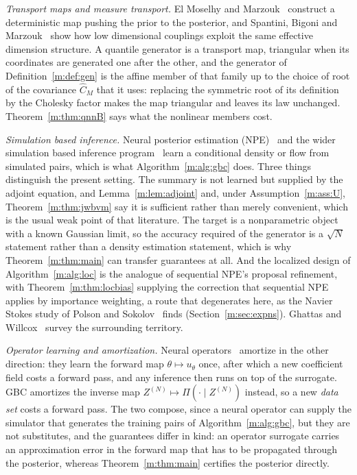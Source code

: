 \emph{Transport maps and measure transport.} El Moselhy and Marzouk~\cite{elmoselhymarzouk2012} construct a deterministic map pushing the prior to the posterior, and Spantini, Bigoni and Marzouk~\cite{spantini2018} show how low dimensional couplings exploit the same effective dimension structure. A quantile generator is a transport map, triangular when its coordinates are generated one after the other, and the generator of Definition~\ref{m:def:gen} is the affine member of that family up to the choice of root of the covariance $\hat C_M$ that it uses: replacing the symmetric root of its definition by the Cholesky factor makes the map triangular and leaves its law unchanged. Theorem~\ref{m:thm:qnnB} says what the nonlinear members cost.

\emph{Simulation based inference.} Neural posterior estimation (NPE)~\cite{greenberg2019,papamakarios2021} and the wider simulation based inference program~\cite{cranmer2020} learn a conditional density or flow from simulated pairs, which is what Algorithm~\ref{m:alg:gbc} does. Three things distinguish the present setting. The summary is not learned but supplied by the adjoint equation, and Lemma~\ref{m:lem:adjoint} and, under Assumption~\ref{m:ass:U}, Theorem~\ref{m:thm:jwbvm} say it is sufficient rather than merely convenient, which is the usual weak point of that literature. The target is a nonparametric object with a known Gaussian limit, so the accuracy required of the generator is a $\sqrt N$ statement rather than a density estimation statement, which is why Theorem~\ref{m:thm:main} can transfer guarantees at all. And the localized design of Algorithm~\ref{m:alg:loc} is the analogue of sequential NPE's proposal refinement, with Theorem~\ref{m:thm:locbias} supplying the correction that sequential NPE applies by importance weighting, a route that degenerates here, as the Navier Stokes study of Polson and Sokolov~\cite{polsonsokolov2026} finds (Section~\ref{m:sec:expns}). Ghattas and Willcox~\cite{ghattaswillcox2021} survey the surrounding territory.

\emph{Operator learning and amortization.} Neural operators~\cite{li2021,kovachki2023} amortize in the other direction: they learn the forward map $\theta\mapsto u_\theta$ once, after which a new coefficient field costs a forward pass, and any inference then runs on top of the surrogate. GBC amortizes the inverse map $Z^{(N)}\mapsto \Pi(\cdot\mid Z^{(N)})$ instead, so a new \emph{data set} costs a forward pass. The two compose, since a neural operator can supply the simulator that generates the training pairs of Algorithm~\ref{m:alg:gbc}, but they are not substitutes, and the guarantees differ in kind: an operator surrogate carries an approximation error in the forward map that has to be propagated through the posterior, whereas Theorem~\ref{m:thm:main} certifies the posterior directly.

